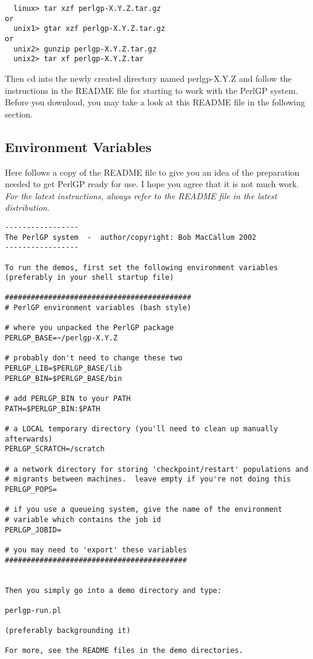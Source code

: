 \documentclass[a4paper]{article}
\begin{document}
\begin{verbatim}
  linux> tar xzf perlgp-X.Y.Z.tar.gz
or
  unix1> gtar xzf perlgp-X.Y.Z.tar.gz
or
  unix2> gunzip perlgp-X.Y.Z.tar.gz
  unix2> tar xf perlgp-X.Y.Z.tar
\end{verbatim}

Then cd into the newly created directory named perlgp-X.Y.Z
and follow the instructions in the README file for starting
to work with the PerlGP system.  Before you download, you
may take a look at this README file in the following section.

\subsection{Environment Variables}

Here follows a copy of the README file to give you an idea of the
preparation needed to get PerlGP ready for use.  I hope you agree that
it is not much work.  \textit{For the latest instructions, always
refer to the README file in the latest distribution.}

\begin{verbatim}
-----------------
The PerlGP system  -  author/copyright: Bob MacCallum 2002
-----------------

To run the demos, first set the following environment variables
(preferably in your shell startup file)

###########################################
# PerlGP environment variables (bash style)

# where you unpacked the PerlGP package
PERLGP_BASE=~/perlgp-X.Y.Z

# probably don't need to change these two
PERLGP_LIB=$PERLGP_BASE/lib
PERLGP_BIN=$PERLGP_BASE/bin

# add PERLGP_BIN to your PATH
PATH=$PERLGP_BIN:$PATH

# a LOCAL temporary directory (you'll need to clean up manually afterwards)
PERLGP_SCRATCH=/scratch

# a network directory for storing 'checkpoint/restart' populations and
# migrants between machines.  leave empty if you're not doing this
PERLGP_POPS=

# if you use a queueing system, give the name of the environment
# variable which contains the job id
PERLGP_JOBID=

# you may need to 'export' these variables
##########################################


Then you simply go into a demo directory and type:

perlgp-run.pl

(preferably backgrounding it)

For more, see the README files in the demo directories.
\end{verbatim}
\end{document}
